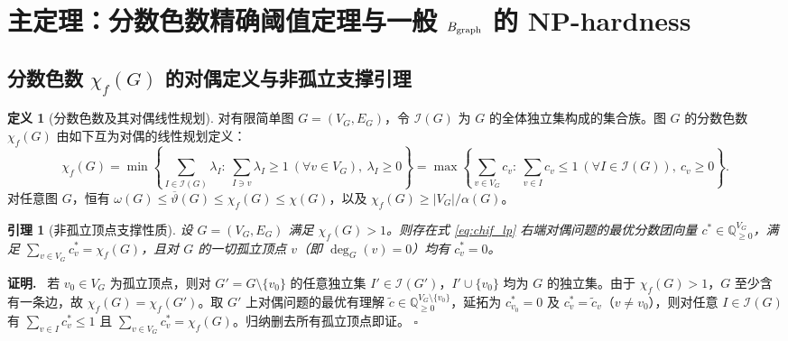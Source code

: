 \documentclass[11pt,a4paper]{ctexart}
\newtheorem{lemma}[theorem]{引理}
\theoremstyle{definition}
\newtheorem{definition}[theorem]{定义}
\newenvironment{proofcn}{\par\noindent\textbf{证明.}\ }{\hfill$\square$\par}
\newcommand{\Ind}{\mathcal I}
\newcommand{\QQ}{\mathbb Q}
\newcommand{\1}{\boldsymbol 1}
\newcommand{\0}{\boldsymbol 0}
\newcommand{\chif}{\chi_f}
\begin{document}
\section{主定理：分数色数精确阈值定理与一般 $B_{\rm graph}$ 的 NP-hardness}

\subsection{分数色数 $\chif(G)$ 的对偶定义与非孤立支撑引理}
\begin{definition}[分数色数及其对偶线性规划]\label{def:chif}
对有限简单图 $G=(V_G,E_G)$，令 $\Ind(G)$ 为 $G$ 的全体独立集构成的集合族。图 $G$ 的分数色数 $\chif(G)$ 由如下互为对偶的线性规划定义：
\begin{equation}\label{eq:chif_lp}
 \chif(G)
 = \min\left\{\sum_{I\in\Ind(G)}\lambda_I:\ \sum_{I\ni v}\lambda_I\ge 1\ (\forall v\in V_G),\ \lambda_I\ge 0\right\}
 = \max\left\{\sum_{v\in V_G}c_v:\ \sum_{v\in I}c_v\le 1\ (\forall I\in\Ind(G)),\ c_v\ge 0\right\}.
\end{equation}
对任意图 $G$，恒有 $\omega(G)\le \overline{\vartheta}(G)\le \chif(G)\le \chi(G)$，以及 $\chif(G)\ge |V_G|/\alpha(G)$。
\end{definition}

\begin{lemma}[非孤立顶点支撑性质]\label{lem:no_isolated}
设 $G=(V_G,E_G)$ 满足 $\chif(G)>1$。则存在式 \eqref{eq:chif_lp} 右端对偶问题的最优分数团向量 $c^*\in\QQ_{\ge 0}^{V_G}$，满足 $\sum_{v\in V_G}c_v^*=\chif(G)$，且对 $G$ 的一切孤立顶点 $v$（即 $\deg_G(v)=0$）均有 $c_v^*=0$。
\end{lemma}
\begin{proofcn}
若 $v_0\in V_G$ 为孤立顶点，则对 $G'=G\setminus\{v_0\}$ 的任意独立集 $I'\in\Ind(G')$，$I'\cup\{v_0\}$ 均为 $G$ 的独立集。由于 $\chif(G)>1$，$G$ 至少含有一条边，故 $\chif(G)=\chif(G')$。取 $G'$ 上对偶问题的最优有理解 $\tilde c\in\QQ_{\ge 0}^{V_G\setminus\{v_0\}}$，延拓为 $c_{v_0}^*=0$ 及 $c_v^*=\tilde c_v$（$v\neq v_0$），则对任意 $I\in\Ind(G)$ 有 $\sum_{v\in I}c_v^*\le 1$ 且 $\sum_{v\in V_G}c_v^*=\chif(G)$。归纳删去所有孤立顶点即证。
\end{proofcn}
\end{document}
